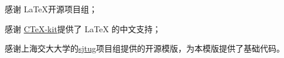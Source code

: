 \begin{acknowledgements}
	感谢 \LaTeX 开源项目组；
	
	感谢 \href{https://github.com/CTeX-org/ctex-kit}{CTeX-kit}提供了 LaTeX 的中文支持；
	
	感谢上海交大大学的\href{https://github.com/sjtug}{sjtug}项目组提供的开源模版，为本模版提供了基础代码。
\end{acknowledgements}
